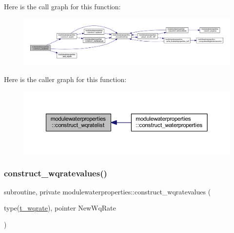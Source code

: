 Here is the call graph for this function\+:\nopagebreak
\begin{figure}[H]
\begin{center}
\leavevmode
\includegraphics[width=350pt]{namespacemodulewaterproperties_abadbafe8dee3212a744771417b0c292a_cgraph}
\end{center}
\end{figure}
Here is the caller graph for this function\+:\nopagebreak
\begin{figure}[H]
\begin{center}
\leavevmode
\includegraphics[width=350pt]{namespacemodulewaterproperties_abadbafe8dee3212a744771417b0c292a_icgraph}
\end{center}
\end{figure}
\mbox{\label{namespacemodulewaterproperties_ad23f7574f0a024c14e1ef11aeadb52ab}} 
\subsubsection{\texorpdfstring{construct\+\_\+wqratevalues()}{construct\_wqratevalues()}}
{\footnotesize\ttfamily subroutine, private modulewaterproperties\+::construct\+\_\+wqratevalues (\begin{DoxyParamCaption}\item[{type(\mbox{\hyperlink{structmodulewaterproperties_1_1t__wqrate}{t\+\_\+wqrate}}), pointer}]{New\+Wq\+Rate }\end{DoxyParamCaption})\hspace{0.3cm}{\ttfamily [private]}}

